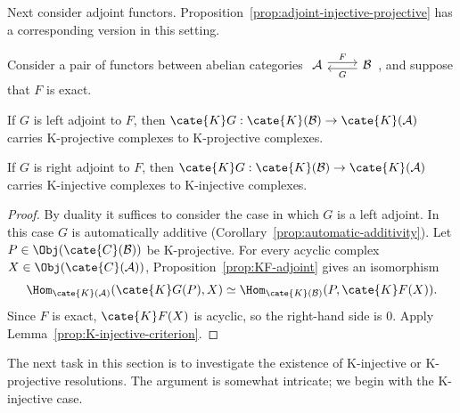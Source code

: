 Next consider adjoint functors. Proposition~\ref{prop:adjoint-injective-projective}
has a corresponding version in this setting.

\begin{proposition}\label{prop:adjoint-injective-projectives-K}
	Consider a pair of functors between abelian categories
	$\begin{tikzcd}
		\mathcal{A} \arrow[r, shift left, "F"] &
		\mathcal{B} \arrow[l, shift left, "G"]
	\end{tikzcd}$,
	and suppose that $F$ is exact.
	\begin{compactitem}
		\item If $G$ is left adjoint to $F$, then
		$\cate{K}G:\cate{K}(\mathcal{B})\to\cate{K}(\mathcal{A})$
		carries K-projective complexes to K-projective complexes.
		\item If $G$ is right adjoint to $F$, then
		$\cate{K}G:\cate{K}(\mathcal{B})\to\cate{K}(\mathcal{A})$
		carries K-injective complexes to K-injective complexes.
	\end{compactitem}
\end{proposition}

\begin{proof}
	By duality it suffices to consider the case in which $G$ is a left
	adjoint. In this case $G$ is automatically additive
	(Corollary~\ref{prop:automatic-additivity}). Let
	$P\in\Obj(\cate{C}(\mathcal{B}))$ be K-projective. For every acyclic
	complex $X\in\Obj(\cate{C}(\mathcal{A}))$,
	Proposition~\ref{prop:KF-adjoint} gives an isomorphism
	\[
	\Hom_{\cate{K}(\mathcal{A})}(\cate{K}G(P), X) \simeq
	\Hom_{\cate{K}(\mathcal{B})}(P, \cate{K}F(X)).
	\]
	Since $F$ is exact, $\cate{K}F(X)$ is acyclic, so the right-hand side is
	$0$. Apply Lemma~\ref{prop:K-injective-criterion}.
\end{proof}

The next task in this section is to investigate the existence of K-injective
or K-projective resolutions. The argument is somewhat intricate; we begin
with the K-injective case.

